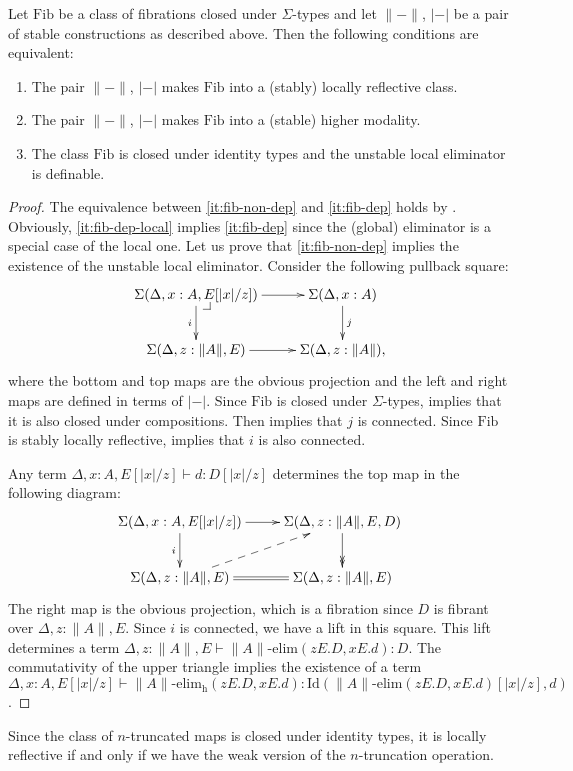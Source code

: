 \documentclass[reqno]{amsart}
\makeatletter
\theoremstyle{definition}
\theoremstyle{remark}
\newcommand{\fs}[1]{\mathrm{#1}}
\newcommand{\Id}{\fs{Id}}
\newcommand{\Fib}{\fs{Fib}}
\numberwithin{figure}{section}
\newcommand{\pb}[1][dr]{\save*!/#1-1.2pc/#1:(-1,1)@^{|-}\restore}
\makeatother
\begin{document}
\begin{prop}
Let $\Fib$ be a class of fibrations closed under $\Sigma$-types and let $\| - \|$, $| - |$ be a pair of stable constructions as described above.
Then the following conditions are equivalent:
\begin{enumerate}
\item \label{it:fib-non-dep} The pair $\| - \|$, $| - |$ makes $\Fib$ into a (stably) locally reflective class.
\item \label{it:fib-dep} The pair $\| - \|$, $| - |$ makes $\Fib$ into a (stable) higher modality.
\item \label{it:fib-dep-local} The class $\Fib$ is closed under identity types and the unstable local eliminator is definable.
\end{enumerate}
\end{prop}
\begin{proof}
The equivalence between \eqref{it:fib-non-dep} and \eqref{it:fib-dep} holds by .
Obviously, \eqref{it:fib-dep-local} implies \eqref{it:fib-dep} since the (global) eliminator is a special case of the local one.
Let us prove that \eqref{it:fib-non-dep} implies the existence of the unstable local eliminator.
Consider the following pullback square:
\[ \xymatrix{ \Sigma(\Delta, x : A, E[|x|/z]) \ar[r] \ar[d]_i \pb   & \Sigma(\Delta, x : A) \ar[d]^j \\
              \Sigma(\Delta, z : \| A \|, E) \ar[r]                 & \Sigma(\Delta, z : \| A \|),
            } \]
where the bottom and top maps are the obvious projection and the left and right maps are defined in terms of $| - |$.
Since $\Fib$ is closed under $\Sigma$-types,  implies that it is also closed under compositions.
Then  implies that $j$ is connected.
Since $\Fib$ is stably locally reflective,  implies that $i$ is also connected.

Any term $\Delta, x : A, E[|x|/z] \vdash d : D[|x|/z]$ determines the top map in the following diagram:
\[ \xymatrix{ \Sigma(\Delta, x : A, E[|x|/z]) \ar[r] \ar[d]_i           & \Sigma(\Delta, z : \| A \|, E, D) \ar@{->>}[d] \\
              \Sigma(\Delta, z : \| A \|, E) \ar@{-->}[ur] \ar@{=}[r]   & \Sigma(\Delta, z : \| A \|, E)
            } \]
The right map is the obvious projection, which is a fibration since $D$ is fibrant over $\Delta, z : \| A \|, E$.
Since $i$ is connected, we have a lift in this square.
This lift determines a term $\Delta, z : \| A \|, E \vdash \| A \|\text{-}\fs{elim}(z E. D, x E. d) : D$.
The commutativity of the upper triangle implies the existence of a term $\Delta, x : A, E[|x|/z] \vdash \| A \|\text{-}\fs{elim_h}(z E. D, x E .d) : \Id(\| A \|\text{-}\fs{elim}(z E. D, x E. d)[|x|/z],d)$.
\end{proof}

\begin{example}
Since the class of $n$-truncated maps is closed under identity types, it is locally reflective if and only if we have the weak version of the $n$-truncation operation.
\end{example}



\end{document}
